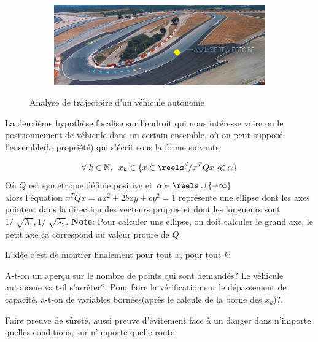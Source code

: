 \begin{figure}[ht]
\begin{subfigure}{.48\textwidth}
		\includegraphics[width=.9\textwidth]{images/trajectoir.png}
		\caption{}
		\label{fig:miror-couleur}
	\end{subfigure}
	\caption{Analyse de trajectoire d'un véhicule autonome}
\end{figure}




 La deuxième hypothèse focalise sur l’endroit qui nous intéresse voire ou le positionnement de  véhicule dans un certain ensemble, où on peut supposé l’ensemble(la propriété) qui s’écrit sous la forme suivante:


\begin{equation}
 \forall \; k \in \mathbb{N}, \;\;   x_{k} \in \{ x \in \reels^{d} / x^{T} Q x \ll \alpha  \}
 \end{equation}  
 Où $Q$ est symétrique définie positive et $\alpha \in \reels\cup \{+ \infty\}$ \\

alors l’équation 
$x^{T} Q x = ax^{2}+2bxy + cy^{2} =1$  représente une ellipse dont les axes pointent dans la direction des vecteurs propres et dont les longueurs sont $1 / \sqrt[]{\lambda_{1}},  1/ \sqrt[]{\lambda_{2}}$.
\textbf{Note}: Pour calculer une ellipse, on doit calculer le grand axe, le petit axe ça correspond au valeur propre de $Q$.


L’idée c’est de montrer finalement pour tout $x$, pour tout $k$:
\begin{itemize}
    \itemperso{} A-t-on un aperçu sur le nombre de points qui sont demandés? Le véhicule autonome va t-il s’arrêter?.
    \itemperso{} Pour faire la vérification sur le dépassement de capacité, a-t-on de variables bornées(après le calcule de la borne des $x_k$)?.
\end{itemize}

Faire preuve de sûreté, aussi preuve d’évitement face à un danger dans n'importe quelles conditions, sur n'importe quelle route. 

